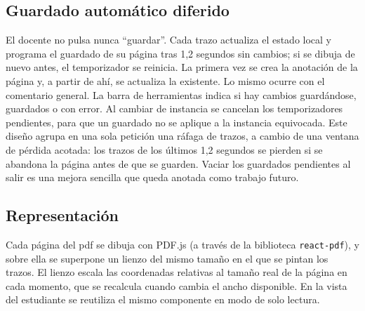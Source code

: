 \subsection{Guardado automático diferido}

El docente no pulsa nunca ``guardar''. Cada trazo actualiza el estado local y
programa el guardado de su página tras 1,2 segundos sin cambios; si se dibuja de nuevo
antes, el temporizador se reinicia. La primera vez se crea la anotación de la página y, a
partir de ahí, se actualiza la existente. Lo mismo ocurre con el comentario general. La
barra de herramientas indica si hay cambios guardándose, guardados o con error. Al cambiar
de instancia se cancelan los temporizadores pendientes, para que un guardado no se aplique
a la instancia equivocada. Este diseño agrupa en una sola petición una ráfaga de trazos, a
cambio de una ventana de pérdida acotada: los trazos de los últimos 1,2 segundos se pierden
si se abandona la página antes de que se guarden. Vaciar los guardados pendientes al salir
es una mejora sencilla que queda anotada como trabajo futuro.

\subsection{Representación}

Cada página del \acs{pdf} se dibuja con PDF.js \cite{pdfjs} (a través de la biblioteca
\texttt{react-pdf}), y sobre ella se superpone un lienzo del mismo tamaño en el que se
pintan los trazos. El lienzo escala las coordenadas relativas al tamaño real de la página
en cada momento, que se recalcula cuando cambia el ancho disponible. En la vista del
estudiante se reutiliza el mismo componente en modo de solo lectura.

